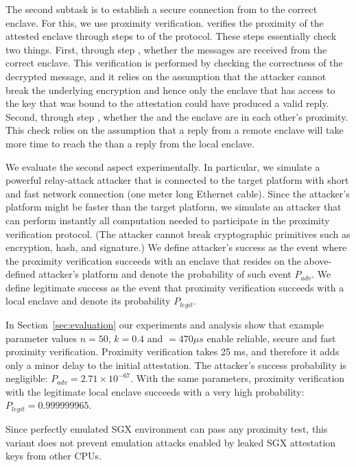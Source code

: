 The second subtask is to establish a secure connection from \device to the correct enclave. For this, we use proximity verification. \device verifies the proximity of the attested enclave through steps \five to \eight of the protocol. These steps essentially check two things. First, through step \seven, whether the messages are received from the correct enclave. This verification is performed by checking the correctness of the decrypted message, and it relies on the assumption that the attacker cannot break the underlying encryption and hence only the enclave that has access to the key that was bound to the attestation could have produced a valid reply. Second, through step \eight, whether the \device and the enclave are in each other's proximity. This check relies on the assumption that a reply from a remote enclave will take more time to reach the \device than a reply from the local enclave.

We evaluate the second aspect experimentally. In particular, we simulate a powerful relay-attack attacker that is connected to the target platform with short and fast network connection (one meter long Ethernet cable). Since the attacker's platform might be faster than the target platform, we simulate an attacker that can perform instantly all computation needed to participate in the proximity verification protocol. (The attacker cannot break cryptographic primitives such as encryption, hash, and signature.) We define attacker's success as the event where the proximity verification succeeds with an enclave that resides on the above-defined attacker's platform and denote the probability of such event $P_{adv}$. We define legitimate success as the event that proximity verification succeeds with a local enclave and denote its probability $P_{legit}$.

In Section~\ref{sec:evaluation} our experiments and analysis show that example parameter values $n=50$, $k=0.4$ and \connect$=470 \mu s$ enable reliable, secure and fast proximity verification. Proximity verification takes 25 ms, and therefore it adds only a minor delay to the initial attestation. The attacker's success probability is negligible: $P_{adv}=2.71\times 10^{-67}$. With the same parameters, proximity verification with the legitimate local enclave succeeds with a very high probability: $P_{legit}=0.999999965$. 

Since perfectly emulated SGX environment can pass any proximity test, this variant does not prevent emulation attacks enabled by leaked SGX attestation keys from other CPUs.

